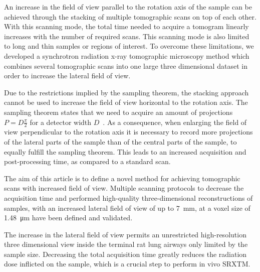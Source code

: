 An increase in the field of view parallel to the rotation axis of the sample can be achieved through the stacking of multiple tomographic scans on top of each other. With this scanning mode, the total time needed to acquire a tomogram linearly increases with the number of required scans. This scanning mode is also limited to long and thin samples or regions of interest. To overcome these limitations, we developed a synchrotron radiation x-ray tomographic microscopy method which combines several tomographic scans into one large three dimensional dataset in order to increase the lateral field of view.

Due to the restrictions implied by the sampling theorem, the stacking approach cannot be used to increase the field of view horizontal to the rotation axis. The sampling theorem states that we need to acquire an amount of projections $P=D\frac{\pi}{2}$ for a detector width $D$~\cite[page 186]{Kak2002}. As a consequence, when enlarging the field of view perpendicular to the rotation axis it is necessary to record more projections of the lateral parts of the sample than of the central parts of the sample, to equally fulfill the sampling theorem. This leads to an increased acquisition and post-processing time, as compared to a standard scan.

The aim of this article is to define a novel method for achieving tomographic scans with increased field of view. Multiple scanning protocols to decrease the acquisition time and performed high-quality three-dimensional reconstructions of samples, with an increased lateral field of view of up to \SI{7}{\milli\meter}, at a voxel size of \SI{1.48}{\micro\meter} have been defined and validated. 

The increase in the lateral field of view permits an unrestricted high-resolution three dimensional view inside the terminal rat lung airways only limited by the sample size. Decreasing the total acquisition time greatly reduces the radiation dose inflicted on the sample, which is a crucial step to perform in vivo SRXTM.
